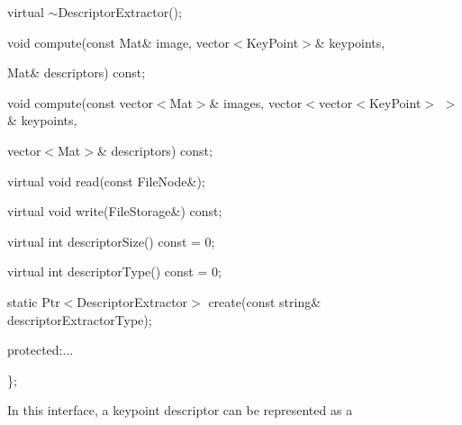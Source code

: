 {\ttfamily }

{\ttfamily }

{\ttfamily virtual $\sim$\+Descriptor\+Extractor();}

{\ttfamily }

{\ttfamily }

{\ttfamily void compute(const Mat\& image, vector$<$\+Key\+Point$>$\& keypoints,}

{\ttfamily }

{\ttfamily }

{\ttfamily Mat\& descriptors) const;}

{\ttfamily }

{\ttfamily }

{\ttfamily void compute(const vector$<$\+Mat$>$\& images, vector$<$vector$<$\+Key\+Point$>$ $>$\& keypoints,}

{\ttfamily }

{\ttfamily }

{\ttfamily vector$<$\+Mat$>$\& descriptors) const;}

{\ttfamily }

{\ttfamily }

{\ttfamily virtual void read(const File\+Node\&);}

{\ttfamily }

{\ttfamily }

{\ttfamily virtual void write(\+File\+Storage\&) const;}

{\ttfamily }

{\ttfamily }

{\ttfamily virtual int descriptor\+Size() const = 0;}

{\ttfamily }

{\ttfamily }

{\ttfamily virtual int descriptor\+Type() const = 0;}

{\ttfamily }

{\ttfamily }

{\ttfamily static Ptr$<$\+Descriptor\+Extractor$>$ create(const string\& descriptor\+Extractor\+Type);}

{\ttfamily }

{\ttfamily }

{\ttfamily protected\+:...}

{\ttfamily }

{\ttfamily }

{\ttfamily \};}

{\ttfamily }

{\ttfamily }

{\ttfamily In this interface, a keypoint descriptor can be represented as a }

